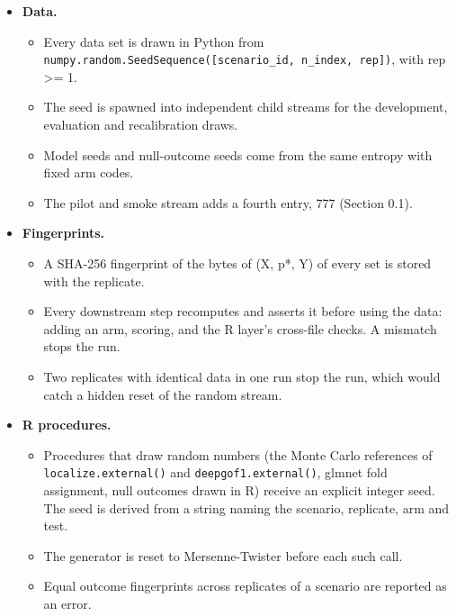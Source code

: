 \documentclass[
  10pt,
]{article}
\providecommand{\tightlist}{%
  \setlength{\itemsep}{0pt}\setlength{\parskip}{0pt}}
\begin{document}
\begin{itemize}
\tightlist
\item
  \textbf{Data.}

  \begin{itemize}
  \tightlist
  \item
    Every data set is drawn in Python from
    \texttt{numpy.random.SeedSequence({[}scenario\_id,\ n\_index,\ rep{]})},
    with rep \textgreater= 1.
  \item
    The seed is spawned into independent child streams for
    the development, evaluation and recalibration draws.
  \item
    Model seeds and null-outcome seeds come from the same
    entropy with fixed arm codes.
  \item
    The pilot and smoke stream adds a fourth entry, 777
    (Section 0.1).
  \end{itemize}
\item
  \textbf{Fingerprints.}

  \begin{itemize}
  \tightlist
  \item
    A SHA-256 fingerprint of the bytes of (X, p*, Y) of
    every set is stored with the replicate.
  \item
    Every downstream step recomputes and asserts it before
    using the data: adding an arm, scoring, and the R
    layer's cross-file checks. A mismatch stops the run.
  \item
    Two replicates with identical data in one run stop the
    run, which would catch a hidden reset of the random
    stream.
  \end{itemize}
\item
  \textbf{R procedures.}

  \begin{itemize}
  \tightlist
  \item
    Procedures that draw random numbers (the Monte Carlo
    references of \texttt{localize.external()} and
    \texttt{deepgof1.external()}, glmnet fold assignment,
    null outcomes drawn in R) receive an explicit integer
    seed. The seed is derived from a string naming the
    scenario, replicate, arm and test.
  \item
    The generator is reset to Mersenne-Twister before each
    such call.
  \item
    Equal outcome fingerprints across replicates of a
    scenario are reported as an error.
  \end{itemize}
\end{itemize}
\end{document}

